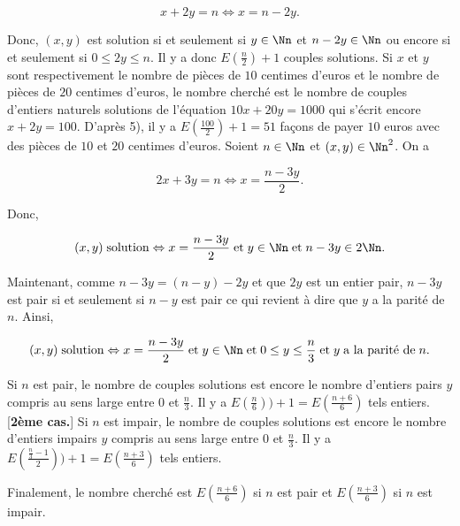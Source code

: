 {\begin{enumerate}
{$$x+2y=n\Leftrightarrow x=n-2y.$$

Donc, $(x,y)$ est solution si et seulement si $y\in\Nn$ et $n-2y\in\Nn$ ou encore si et seulement si $0\leq2y\leq n$.
Il y a donc $E(\frac{n}{2})+1$ couples solutions.
Si $x$ et $y$ sont respectivement le nombre de pièces de $10$ centimes d'euros et le nombre de pièces de $20$
centimes d'euros, le nombre cherché est le nombre de couples d'entiers naturels solutions de l'équation $10x+20y=1000$
qui s'écrit encore $x+2y=100$. D'après 5), il y a $E(\frac{100}{2})+1=51$ façons de payer $10$ euros avec des pièces de
$10$ et $20$ centimes d'euros.
Soient $n\in\Nn$ et $(x,y)\in\Nn^2$. On a

$$2x+3y=n\Leftrightarrow x=\frac{n-3y}{2}.$$

Donc,

$$(x,y)\;\mbox{solution}\Leftrightarrow x=\frac{n-3y}{2}\;\mbox{et}\;y\in\Nn\;\mbox{et}\;n-3y\in2\Nn.$$

Maintenant, comme $n-3y=(n-y)-2y$ et que $2y$ est un entier pair, $n-3y$ est pair si et seulement si $n-y$ est pair ce
qui revient à dire que $y$ a la parité de $n$. Ainsi,

$$(x,y)\;\mbox{solution}\Leftrightarrow x=\frac{n-3y}{2}\;\mbox{et}\;y\in\Nn\;\mbox{et}\;0\leq y\leq
\frac{n}{3}\;\mbox{et}\;y\;\mbox{a la parité de}\;n.$$

\begin{itemize}
 Si $n$ est pair, le nombre de couples solutions est encore le nombre d'entiers pairs $y$
compris au sens large entre $0$ et $\frac{n}{3}$. Il y a $E(\frac{n}{6}))+1=E(\frac{n+6}{6})$ tels entiers.
[\textbf{2ème cas.}] Si $n$ est impair, le nombre de couples solutions est encore le nombre d'entiers impairs $y$
compris au sens large entre $0$ et $\frac{n}{3}$. Il y a  $E(\frac{\frac{n}{3}-1}{2}))+1=E(\frac{n+3}{6})$ tels
entiers.
\end{itemize}
Finalement, le nombre cherché est $E(\frac{n+6}{6})$ si $n$ est pair et $E(\frac{n+3}{6})$ si $n$ est impair.
}
\end{enumerate}
}
